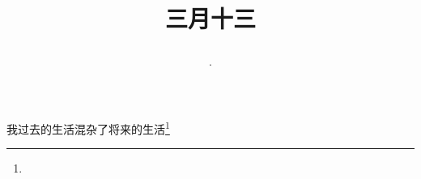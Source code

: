 \title{\date[d=21,m=4,y=2024][year:cn-y,年,month:cn,day:cn,日,·,weekday]·三月十三 }
我过去的生活混杂了将来的生活\footnote{ }

